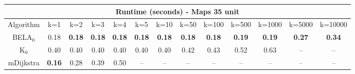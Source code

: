 \begin{tabular}{c|cccccccccccc}\toprule
\multicolumn{13}{c}{Runtime (seconds) - Maps 35 unit}\\ \midrule
Algorithm & k=1 & k=2 & k=3 & k=4 & k=5 & k=10 & k=50 & k=100 & k=500 & k=1000 & k=5000 & k=10000 \\ \midrule
BELA$_0$ & 0.18 & \textbf{0.18} & \textbf{0.18} & \textbf{0.18} & \textbf{0.18} & \textbf{0.18} & \textbf{0.18} & \textbf{0.18} & \textbf{0.19} & \textbf{0.19} & \textbf{0.27} & \textbf{0.34} \\
K$_0$ & 0.40 & 0.40 & 0.40 & 0.40 & 0.40 & 0.40 & 0.42 & 0.43 & 0.52 & 0.63 & -- & -- \\
mDijkstra & \textbf{0.16} & 0.28 & 0.39 & 0.50 & -- & -- & -- & -- & -- & -- & -- & -- \\ \bottomrule 
\end{tabular}
